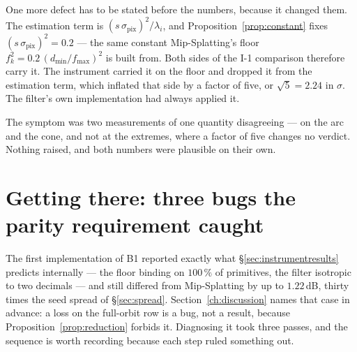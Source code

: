 One more defect has to be stated before the numbers, because it changed them.
The estimation term is $(s\,\sigma_{\mathrm{pix}})^2/\lambda_i$, and
Proposition~\ref{prop:constant} fixes $(s\,\sigma_{\mathrm{pix}})^2 = 0.2$ ---
the same constant Mip-Splatting's floor $f_k^2 = 0.2\,(d_{\min}/f_{\max})^2$ is
built from. Both sides of the I-1 comparison therefore carry it. The instrument
carried it on the floor and dropped it from the estimation term, which inflated
that side by a factor of five, or $\sqrt{5} = 2.24$ in $\sigma$. The filter's own
implementation had always applied it.

The symptom was two measurements of one quantity disagreeing --- on the arc and
the cone, and not at the extremes, where a factor of five changes no verdict.
Nothing raised, and both numbers were plausible on their own.



\section{Getting there: three bugs the parity requirement caught}
\label{sec:b1bugs}

The first implementation of B1 reported exactly what
\S\ref{sec:instrumentresults} predicts internally --- the floor binding on
$100\,\%$ of primitives, the filter isotropic to two decimals --- and still
differed from Mip-Splatting by up to $1.22$\,dB, thirty times the seed spread of
\S\ref{sec:spread}. Section~\ref{ch:discussion} names that case in advance: a
loss on the full-orbit row is a bug, not a result, because
Proposition~\ref{prop:reduction} forbids it. Diagnosing it took three passes,
and the sequence is worth recording because each step ruled something out.

